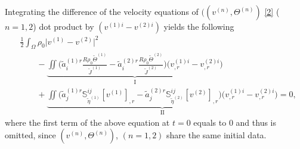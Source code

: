 \documentclass[12pt,a4paper]{amsart}
\numberwithin{equation}{section}
\theoremstyle{plain}
\theoremstyle{definition}
\begin{document}
Integrating the difference of the velocity equations of $((v^{(n)},\Theta^{(n)})$ \eqref{2} ($n=1,2$) dot product by $(v^{(1)i}-v^{(2)i})$ yields the following
\begin{align*}
&\frac{1}{2}\int_{\Omega}\rho_{0}\Big| v^{(1)}-v^{(2)} \Big|^2 \\
&\qquad -\underbrace{\iint \Big(\widetilde{a}^{(1)r}_i \frac{R\rho_{0}\widetilde{\Theta}^{(1)} }{\widetilde{J}^{(1)}}-\widetilde{a}^{(2)r}_i \frac{R\rho_{0}\widetilde{\Theta}^{(2)} }{\widetilde{J}^{(2)}}  \Big) \Big(v^{(1)i}_{,r}-v^{(2)i}_{,r}\Big)}_{\mathrm{I}}\\
&\qquad +\underbrace{\iint \Big( \widetilde{a}^{(1)r}_j\mathbb{S}^{ij}_{\widetilde{\eta}^{(1)}}[v^{(1)}]_{,r}-\widetilde{a}^{(2)r}_j\mathbb{S}^{ij}_{\widetilde{\eta}^{(2)}}[v^{(2)}]_{,r} \Big)\Big(v^{(1)i}_{,r}-v^{(2)i}_{,r}\Big)}_{\mathrm{II}}=0,
\end{align*}
where the first term of the above equation at $t=0$ equals to $0$ and thus is omitted, since  $(v^{(n)},\Theta^{(n)})$, $(n=1,2)$ share the same initial data. 
\end{document}
